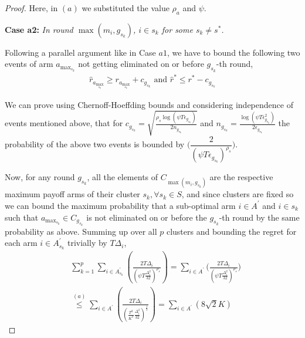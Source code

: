 \begin{proof}
  Here, in $(a)$ we substituted the value $\rho_a$ and $\psi$.




\textbf{Case a2:} \textit{In round $\max(m_{i},g_{s_{k}})$, ${i} \in s_k$ for some $s_k \ne s^{*}$.}

Following a parallel argument like in Case $a1$, we have to bound the following two events of arm $a_{\max_{s_{k}}}$ not getting eliminated on or before $g_{s_{k}}$-th round,
\begin{align*}
  \hat{r}_{a_{\max_{s_{k}}}} \geq r_{a_{\max_{s_{k}}}} +c_{g_{s_{k}}} \text{ and } \hat{r}^{*} \leq r^{*} - c_{g_{s_{k}}} 
\end{align*} 

We can prove using Chernoff-Hoeffding bounds and considering independence of events mentioned above, that for $c_{g_{s_{k}}}=\sqrt{\frac{\rho_{s} \log (\psi T\epsilon_{g_{s_{k}}})}{2 n_{g_{s_{k}}}}}$ and  $n_{g_{s_{k}}}=\frac{\log{(\psi T\epsilon_{g_{s_{k}}}^{2})}}{2\epsilon_{g_{s_{k}}}}$ the probability of the above two events is bounded by $\bigg(\dfrac{2}{(\psi  T\epsilon_{g_{s_{k}}})^{\rho_{s}}}\bigg)$.

  Now, for any round $g_{s_{k}}$, all the elements of $C_{\max(m_{i},g_{s_{k}})}$ are the respective maximum payoff arms of their cluster $s_{k}, \forall s_{k}\in S$, and since clusters are fixed so we can bound the maximum probability that a sub-optimal arm ${i}\in A^{'}$  and ${i}\in s_{k}$ such that $a_{\max_{s_{k}}}\in C_{g_{s_{k}}}$ is not eliminated on or before the $g_{s_{k}}$-th round by the same probability as above. Summing up over all $p$ clusters and bounding the regret for each arm $i\in A_{s_{k}}^{'}$ trivially by $T\Delta_{i}$,
 \begin{align*}
 &\sum_{k=1}^{p}\sum_{i\in A_{s_{k}}^{'}}\left(\frac{2T\Delta_{i}}{(\psi T\frac{\Delta_{i}^{2}}{32})^{\rho_{s}}}\right) = \sum_{i\in A^{'}}\bigg( \frac{2T\Delta_{i}}{(\psi  T\frac{\Delta_{i}^{2}}{32})^{\rho_{s}}} \bigg) \\
 & \overset{(a)}{\leq} \sum_{i\in A^{'}}\left(\frac{2T\Delta_{i}}{(\frac{T^2}{K^2}\frac{\Delta_{i}^{2}}{32})^{\frac{1}{2}}}\right) = \sum_{i\in A^{'}} \left( 8\sqrt{2}K \right)
 \end{align*}


\end{proof}
